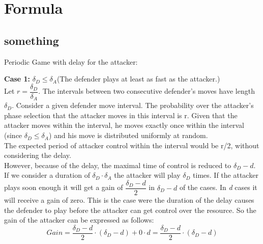 \chapter{Formula}
\label{cha:9}
%



\section{something}
\label{Cha:9:inrto}

Periodic Game with delay for the attacker:

\textbf{Case 1:} $\delta_{D} \leq \delta_{A} $(The defender plays at least as fast as the attacker.) \\

Let $r = \dfrac{\delta_{D}}{ \delta_{A} }$. The intervals between two consecutive defender's moves have length $\delta_{D}$. Consider a given defender move interval. The probability over the attacker's phase selection that the attacker moves in this interval is r. Given that the attacker moves within the interval, he moves exactly once within the interval (since $\delta_{D} \leq \delta_{A} $) and his move is distributed uniformly at random. \\

The expected period of attacker control within the interval would be r/2, without considering the delay. \\

However, because of the delay, the maximal time of control is reduced to $\delta_{D}-d$. If we consider a duration of $\delta_{D} \cdot \delta_{A}$ the attacker will play $\delta_{D}$ times. If the attacker plays soon enough it will get a gain of $\dfrac{\delta_{D}-d}{2}$ in $\delta_{D}-d$ of the cases. In \textit{d} cases it will receive a gain of zero. This is the case were the duration of the delay causes the defender to play before the attacker can get control over the resource. 
So the gain of the attacker can be expressed as follows:
\begin{equation}\label{first}
Gain =  \dfrac{\delta_{D}-d}{2} \cdot (\delta_{D}-d) + 0 \cdot d = \dfrac{\delta_{D}-d}{2} \cdot (\delta_{D}-d)
\end{equation}

